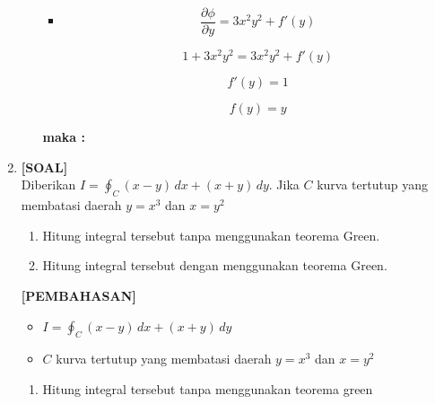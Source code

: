 \documentclass[a4paper,12pt]{article}
\begin{document}
\begin{enumerate}
\begin{enumerate}[start = 1]
\vspace{0.5cm}

\begin{itemize}
\item
        \[\frac{\partial \phi}{\partial y} = 3x^2y^2 + f'(y)\]
        
        \[1 + 3x^2y^2 = 3x^2y^2 + f'(y)\]
        
        \[f'(y) = 1\]
        
        \[f(y) = y\]
        
\end{itemize}

\vspace{0.5cm}

\textbf{maka :\hspace{4cm}} 

 \end{enumerate}

\newpage
    \item \textbf{[SOAL]}\\
        Diberikan $\displaystyle I = \oint_{C} (x - y)\, dx + (x + y)\, dy$. Jika $C$ kurva tertutup yang membatasi daerah $y = x^{3}$ dan $x=y^{2}$
            \begin{enumerate}[start = 1]
                \item Hitung integral tersebut tanpa menggunakan teorema Green.
                \item Hitung integral tersebut dengan menggunakan teorema Green.
            \end{enumerate}

        \textbf{[PEMBAHASAN]}
        \begin{itemize}
            \item $\displaystyle I = \oint_{C} (x - y)\, dx + (x + y)\, dy$
            \item $C$ kurva tertutup yang membatasi daerah $y = x^{3}$ dan $x = y^{2}$
        \end{itemize}
        \begin{enumerate}[start = 1]
            \item Hitung integral tersebut tanpa menggunakan teorema green

\end{enumerate}
\end{enumerate}
\end{document}

